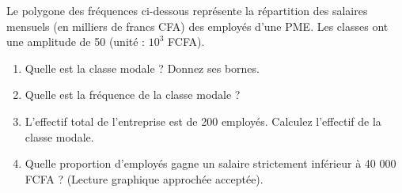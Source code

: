 \documentclass[11pt]{article}
\begin{document}
\begin{exercice}
Le polygone des fréquences ci-dessous représente la répartition des salaires mensuels (en milliers de francs CFA) des employés d'une PME. Les classes ont une amplitude de 50 (unité : $10^3$ FCFA).

\begin{center}
\end{center}

\begin{enumerate}
    \item Quelle est la classe modale ? Donnez ses bornes.
    \item Quelle est la fréquence de la classe modale ?
    \item L'effectif total de l'entreprise est de 200 employés. Calculez l'effectif de la classe modale.
    \item Quelle proportion d'employés gagne un salaire strictement inférieur à 40 000 FCFA ? (Lecture graphique approchée acceptée).
\end{enumerate}
\end{exercice}
\end{document}
